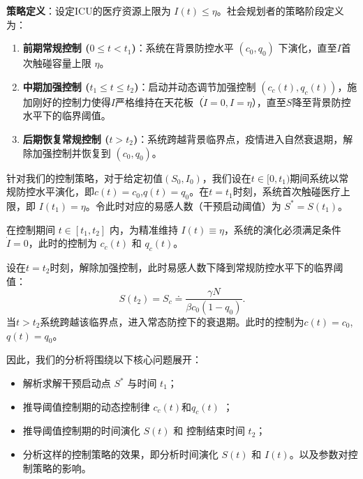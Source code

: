 \documentclass[lang=cn,a4paper,newtx]{elegantpaper}
\numberwithin{equation}{section}
\theoremstyle{plain}
\begin{document}
\textbf{策略定义}：设定ICU的医疗资源上限为 $I(t) \le \eta$。社会规划者的策略阶段定义为：
\begin{enumerate}
    \item \textbf{前期常规控制 ($0 \le t < t_1$)}：系统在背景防控水平 $(c_0,q_0)$ 下演化，直至$I$首次触碰容量上限 $\eta$。
    \item \textbf{中期加强控制 ($t_1 \le t \le t_2$)}：启动并动态调节加强控制 $(c_c(t),q_c(t))$，施加刚好的控制力使得$I$严格维持在天花板（$\dot{I}=0, I=\eta$），直至$S$降至背景防控水平下的临界阈值。
    \item \textbf{后期恢复常规控制 ($t > t_2$)}：系统跨越背景临界点，疫情进入自然衰退期，解除加强控制并恢复到 $(c_0,q_0)$。
\end{enumerate}

针对我们的控制策略，对于给定初值$(S_0, I_0)$，我们设在$t \in [0, t_1)$期间系统以常规防控水平演化，即$c(t) = c_0$,$q(t) = q_0$。在$t = t_1$时刻，系统首次触碰医疗上限，即 $I(t_1) = \eta$。令此时对应的易感人数（干预启动阈值）为 $S^* = S(t_1)$。

在控制期间 $t \in [t_1, t_2]$ 内，为精准维持 $I(t) \equiv \eta$，系统的演化必须满足条件 $\dot{I} = 0$，此时的控制为 $c_c(t)$ 和 $q_c(t)$。

设在$t = t_2$时刻，解除加强控制，此时易感人数下降到常规防控水平下的临界阈值：
\begin{equation}
S(t_2)=S_c\doteq \frac{ \gamma N}{\beta c_0(1-q_0)}.
\end{equation}
当$t > t_2$系统跨越该临界点，进入常态防控下的衰退期。此时的控制为$c(t)=c_0$,$q(t)=q_0$。


因此，我们的分析将围绕以下核心问题展开：
\begin{itemize}
    \item 解析求解干预启动点 $S^*$ 与时间 $t_1$；
    \item 推导阈值控制期的动态控制律 $c_c(t)$和$q_c(t)$ ；
    \item 推导阈值控制期的时间演化 $S(t)$ 和 控制结束时间 $t_2$；
    \item 分析这样的控制策略的效果，即分析时间演化 $S(t)$ 和 $I(t)$。以及参数对控制策略的影响。                                                   
\end{itemize}
\end{document}
